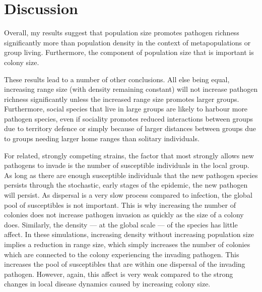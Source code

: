 \section{Discussion}



Overall, my results suggest that population size promotes pathogen richness significantly more than population density in the context of metapopulations or group living.
Furthermore, the component of population size that is important is colony size.

These results lead to a number of other conclusions.
All else being equal, increasing range size (with density remaining constant) will not increase pathogen richness significantly unless the increased range size promotes larger groups.
Furthermore, social species that live in large groups are likely to harbour more pathogen species, even if sociality promotes reduced interactions between groups due to territory defence or simply because of larger distances between groups due to groups needing larger home ranges than solitary individuals.



For related, strongly competing strains, the factor that most strongly allows new pathogens to invade is the number of susceptible individuals in the local group.
As long as there are enough susceptible individuals that the new pathogen species persists through the stochastic, early stages of the epidemic, the new pathogen will persist.
As dispersal is a very slow process compared to infection, the global pool of susceptibles is not important. 
This is why increasing the number of colonies does not increase pathogen invasion as quickly as the size of a colony does.
Similarly, the density --- at the global scale --- of the species has little affect.
In these simulations, increasing density without increasing population size implies a reduction in range size, which simply increases the number of colonies which are connected to the colony experiencing the invading pathogen.
This increases the pool of susceptibles that are within one dispersal of the invading pathogen.
However, again, this affect is very weak compared to the strong changes in local disease dynamics caused by increasing colony size.



